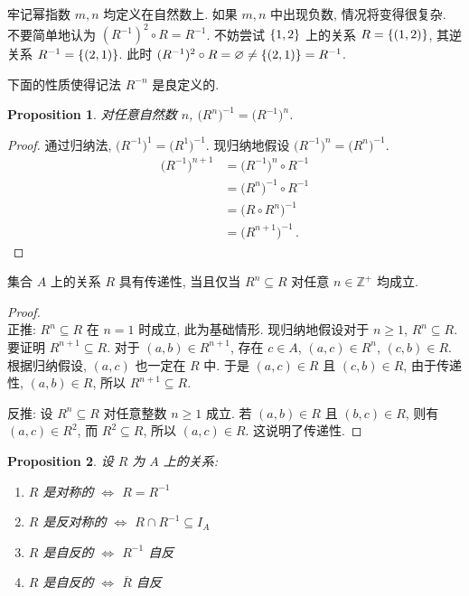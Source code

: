 \documentclass[UTF8]{ctexart}
\theoremstyle{mystyle}
\newtheorem{proposition}{Proposition}[section]
\theoremstyle{myremark}
\theoremstyle{plain}
\newcommand{\Z}{\mathbb Z}
\DeclarePairedDelimiter\set{\{}{\}}
\begin{document}
牢记幂指数 $ m, n $ 均定义在自然数上. 如果 $ m, n $ 中出现负数, 情况将变得很复杂. 不要简单地认为 $ (R^{-1})^2 \circ R = R^{-1} $. 不妨尝试 $ \set{1, 2} $ 上的关系 $ R = \set{(1, 2)} $, 其逆关系 $ R^{-1} = \set{(2, 1)} $. 此时 $ (R^{-1})^2 \circ R = \varnothing \neq \set{(2, 1)} = R^{-1} $.

下面的性质使得记法 $ R^{-n} $ 是良定义的.
\begin{proposition}
    对任意自然数 $ n $, $ \bigl( R^n \bigr)^{-1} = \bigl( R^{-1} \bigr)^n $.
\end{proposition}

\begin{proof}
    通过归纳法, $ \bigl( R^{-1} \bigr)^1 = \bigl( R^1 \bigr)^{-1} $. 现归纳地假设 $ \bigl( R^{-1} \bigr)^n = \bigl( R^n \bigr)^{-1} $.
    \begin{align*}
        \bigl( R^{-1} \bigr)^{n + 1} &= \bigl( R^{-1} \bigr)^n \circ R^{-1} \\
        &= \bigl( R^n \bigr)^{-1} \circ R^{-1} \\
        &= \bigl( R \circ R^n \bigr)^{-1} \\
        &= \bigl( R^{n + 1} \bigr)^{-1} \,.
    \end{align*}
\end{proof}

    


\begin{theorem}
    集合 $ A $ 上的关系 $ R $ 具有传递性, 当且仅当 $ R^n \subseteq R $ 对任意 $ n \in \Z^+ $ 均成立.
\end{theorem}

\begin{proof} \ \\
    正推: $ R^n \subseteq R $ 在 $ n = 1 $ 时成立, 此为基础情形. 现归纳地假设对于 $ n \geqslant 1 $, $ R^n \subseteq R $. 要证明 $ R^{n + 1} \subseteq R $. 对于 $ (a, b) \in R^{n + 1} $, 存在 $ c \in A $, $ (a, c) \in R^n $, $ (c, b) \in R $. 根据归纳假设, $ (a, c) $ 也一定在 $ R $ 中. 于是 $ (a, c) \in R $ 且 $ (c, b) \in R $, 由于传递性, $ (a, b) \in R $, 所以 $ R^{n + 1} \subseteq R $.
    
    反推: 设 $ R^n \subseteq R $ 对任意整数 $ n \geqslant 1 $ 成立. 若 $ (a, b) \in R $ 且 $ (b, c) \in R $, 则有 $ (a, c) \in R^2 $, 而 $ R^2 \subseteq R $, 所以 $ (a, c) \in R $. 这说明了传递性.
\end{proof}


\begin{proposition}
    设 $ R $ 为 $ A $ 上的关系:
    \begin{enumerate}
        \item $ R $ 是对称的 $ \iff $ $ R = R^{-1} $
        \item $ R $ 是反对称的 $ \iff $ $ R \cap R^{-1} \subseteq I_A $
        \item $ R $ 是自反的 $ \iff $ $ R^{-1} $ 自反
        \item $ R $ 是自反的 $ \iff $ $ \overline R $ 自反
    \end{enumerate}
\end{proposition}
\end{document}
